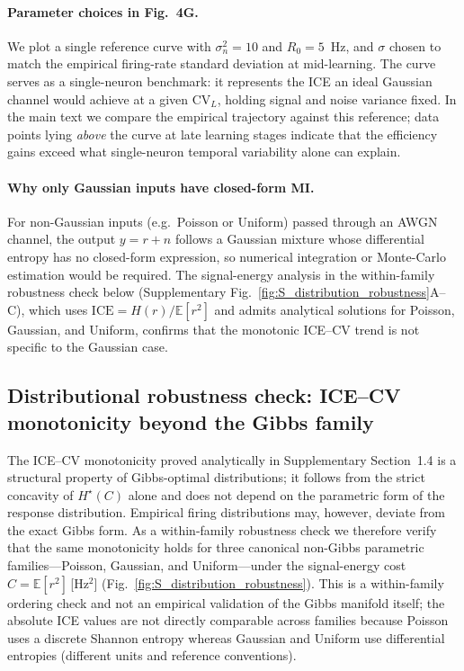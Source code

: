 \documentclass[11pt]{article}
\theoremstyle{remark}
\theoremstyle{definition}
\begin{document}
\paragraph{Parameter choices in Fig.~4G.}
We plot a single reference curve with $\sigma_n^2 = 10$ and $R_0 = 5$~Hz, and $\sigma$ chosen to match the empirical firing-rate standard deviation at mid-learning.  The curve serves as a single-neuron benchmark: it represents the ICE an ideal Gaussian channel would achieve at a given $\mathrm{CV}_L$, holding signal and noise variance fixed.  In the main text we compare the empirical trajectory against this reference; data points lying \emph{above} the curve at late learning stages indicate that the efficiency gains exceed what single-neuron temporal variability alone can explain.

\paragraph{Why only Gaussian inputs have closed-form MI.}
For non-Gaussian inputs (e.g.\ Poisson or Uniform) passed through an AWGN channel, the output $y = r + n$ follows a Gaussian mixture whose differential entropy has no closed-form expression, so numerical integration or Monte-Carlo estimation would be required.  The signal-energy analysis in the within-family robustness check below (Supplementary Fig.~\ref{fig:S_distribution_robustness}A--C), which uses $\text{ICE} = H(r)/\mathbb{E}[r^2]$ and admits analytical solutions for Poisson, Gaussian, and Uniform, confirms that the monotonic ICE--CV trend is not specific to the Gaussian case.


\subsection{Distributional robustness check: ICE--CV monotonicity beyond the Gibbs family}
\label{sec:distribution-robustness}

The ICE--CV monotonicity proved analytically in Supplementary Section~1.4 is a structural property of Gibbs-optimal distributions; it follows from the strict concavity of $H^\star(C)$ alone and does not depend on the parametric form of the response distribution.  Empirical firing distributions may, however, deviate from the exact Gibbs form.  As a within-family robustness check we therefore verify that the same monotonicity holds for three canonical non-Gibbs parametric families---Poisson, Gaussian, and Uniform---under the signal-energy cost $C=\mathbb{E}[r^2]$\,[Hz$^2$] (Fig.~\ref{fig:S_distribution_robustness}).  This is a within-family ordering check and not an empirical validation of the Gibbs manifold itself; the absolute ICE values are not directly comparable across families because Poisson uses a discrete Shannon entropy whereas Gaussian and Uniform use differential entropies (different units and reference conventions).
\end{document}
